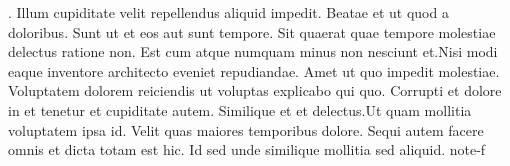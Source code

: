 
\setbox\excessA\vbox{\hsize=200pt 
. Illum cupiditate velit repellendus aliquid impedit. Beatae et ut quod a doloribus. Sunt ut et eos aut sunt tempore. Sit quaerat quae tempore molestiae delectus ratione non. Est cum atque numquam minus non nesciunt et.Nisi modi eaque inventore architecto eveniet repudiandae. Amet ut quo impedit molestiae. Voluptatem dolorem reiciendis ut voluptas explicabo qui quo. Corrupti et dolore in et tenetur et cupiditate autem. Similique et et delectus.Ut quam mollitia voluptatem ipsa id. Velit quas maiores temporibus dolore. Sequi autem facere omnis et dicta totam est hic. Id sed unde similique mollitia sed aliquid.}
\endgraf
\def\ins@meas@trialpenalty{-10010}
\ptxfile{}\everypar{}\let\par\endgraf
{}
\newcount\cols
\newdimen\max
\iflua
{}
\fi
\x@\count\csname note-f


\def\try#1{\count255=1 \max=0pt
  \cols=\csname cols#1\endcsname
  \setbox0\copy\csname excess#1\endcsname
  \let\dims\empty
  \let\ins@rtl@st\empty
  \def\ins@meas@trial@result{0pt}%
  \def\ins@meas@trial@dims{}%
  \let\ins@rtsplitlist\empty
  \loop
    \setbox\count255=\vsplit0 to \dimen1\setbox \count255\vbox{\unvbox\count255}%
    \ifdim\max<\ht\count255 \max=\ht\count255 \fi
    \edef\dims{\ifx\dims\empty\else\dims,\fi \the\ht\count255}%
    \edef\tmp{\splitbotmark}
    \ifx\tmp\empty
      \x@\edef\csname #1bot\endcsname{0}%
    \else
      \x@\extr@ctfirst\splitbotmark\relax
      \x@\edef\csname #1bot\endcsname{\v@rsefrom}%
    \fi
    \iflua\directlua{measure_ins(\the\count255)}
      \trace{imt}{ins@meas@trial@result=\ins@meas@trial@result(\ins@meas@trial@dims)}%
    \else
      \ins@meas@trialfullfalse
      \me@sureins@trial{#1}{\the\count255}%
    \fi
    \edef\ins@rtl@st{\ifx\ins@rtl@st\empty\else\ins@rtl@st+\fi\ins@meas@trial@result}%
    \edef\ins@rtsplitlist{\ifx\ins@rtsplitlist\empty\else\ins@rtsplitlist+\fi\ins@meas@trial@dims}%
  \ifnum \count255<\cols
    \advance\count255 by 1
    \repeat
  \count255=1 
  \dimen0=0pt
  \loop
    \advance\dimen0\dimexpr\max-\ht\count255\relax
  \ifnum \count255<\cols
    \advance\count255 by 1
    \repeat
  \x@\let\x@\tmp\csname #1list\endcsname  
  \edef\tryid{#1/\the\dimen1}
  \x@\xdef\csname #1list\endcsname{\ifx\tmp\relax\else\tmp\fi\tryid,}
  \edef\tmp{\the\max|\number\dimexpr 10\dimen0 /\baselineskip\relax|\csname #1bot\endcsname|\dims|\ins@rtl@st|\ins@rtsplitlist}\trace{dmc}{\tryid: \tmp}\par
  \x@\let\csname \tryid\endcsname\tmp
}



